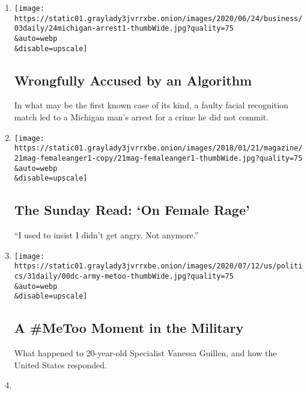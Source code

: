 \begin{enumerate}
\def\labelenumi{\arabic{enumi}.}
\item
  \href{/2020/08/03/podcasts/the-daily/algorithmic-justice-racism.html}{}

  \texttt{[image: https://static01.graylady3jvrrxbe.onion/images/2020/06/24/business/03daily/24michigan-arrest1-thumbWide.jpg?quality=75\\\&auto=webp\\\&disable=upscale]}

  \hypertarget{wrongfully-accused-by-an-algorithm}{%
  \subsection{Wrongfully Accused by an
  Algorithm}\label{wrongfully-accused-by-an-algorithm}}

  In what may be the first known case of its kind, a faulty facial
  recognition match led to a Michigan man's arrest for a crime he did
  not commit.
\item
  \href{/2020/08/02/podcasts/the-daily/on-female-rage.html}{}

  \texttt{[image: https://static01.graylady3jvrrxbe.onion/images/2018/01/21/magazine/21mag-femaleanger1-copy/21mag-femaleanger1-thumbWide.jpg?quality=75\\\&auto=webp\\\&disable=upscale]}

  \hypertarget{the-sunday-read-on-female-rage}{%
  \subsection{The Sunday Read: `On Female
  Rage'}\label{the-sunday-read-on-female-rage}}

  ``I used to insist I didn't get angry. Not anymore.''
\item
  \href{/2020/07/31/podcasts/the-daily/vanessa-guillen-military-metoo.html}{}

  \texttt{[image: https://static01.graylady3jvrrxbe.onion/images/2020/07/12/us/politics/31daily/00dc-army-metoo-thumbWide.jpg?quality=75\\\&auto=webp\\\&disable=upscale]}

  \hypertarget{a-metoo-moment-in-the-military}{%
  \subsection{A \#MeToo Moment in the
  Military}\label{a-metoo-moment-in-the-military}}

  What happened to 20-year-old Specialist Vanessa Guillen, and how the
  United States responded.
\item
  \href{/2020/07/30/podcasts/the-daily/congress-facebook-amazon-google-apple.html}{}


\end{enumerate}
